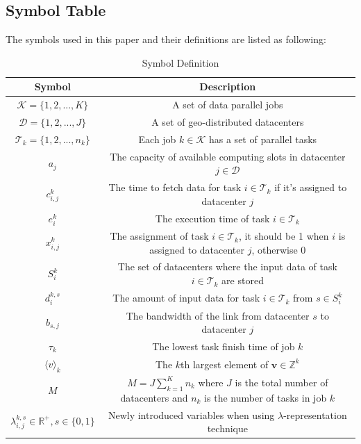 \documentclass{llncs}
\begin{document}
\subsection{Symbol Table}
The symbols used in this paper and their definitions are listed as following:
\begin{table}[htbp]
    \centering
    \caption{Symbol Definition}
    \begin{tabular}{|c|c|}
    \hline
        {\bf Symbol} & {\bf Description} \\ \hline
        $\mathcal{K}=\{1,2,...,K\}$ & A set of data parallel jobs \\ \hline
        $\mathcal{D}=\{1,2,...,J\}$ & A set of geo-distributed datacenters \\ \hline
        $\mathcal{T}_k=\{1,2,...,n_k\}$ & Each job $k \in \mathcal{K}$ has a set of parallel tasks \\ \hline
        $a_j$ & The capacity of available computing slots in datacenter $j \in \mathcal{D}$ \\ \hline
        $c_{i,j}^k$ & The time to fetch data for task $i \in \mathcal{T}_k$ if it's assigned to datacenter $j$ \\ \hline
        $e_{i}^k$ & The execution time of task $i \in \mathcal{T}_k$ \\ \hline
        $x_{i,j}^k$ & The assignment of task $i \in \mathcal{T}_k$, it should be 1 when $i$ is assigned to datacenter $j$, otherwise 0 \\ \hline
        $S_i^k$ & The set of datacenters where the input data of task $i \in \mathcal{T}_k$ are stored \\ \hline
        $d_i^{k,s}$ & The amount of input data for task $i \in \mathcal{T}_k$ from $s \in S_i^k$ \\ \hline
        $b_{s,j}$ & The bandwidth of the link from datacenter $s$ to datacenter $j$ \\ \hline
        $\tau_k$ & The lowest task finish time of job $k$ \\ \hline
        $\langle v \rangle_k$ & The $k$th largest element of $\mathbf{v} \in \mathbb{Z}^k$ \\ \hline
        $M$ & $M=J\sum_{k=1}^Kn_k$ where $J$ is the total number of datacenters and $n_k$ is the number of tasks in job $k$ \\ \hline
        $\lambda_{i,j}^{k,s} \in \mathbb{R}^+, s\in\{0,1\}$ & Newly introduced variables when using $\lambda$-representation technique \\
    \hline
    \end{tabular}
    \label{tab:Symbols}
\end{table}
\end{document}
